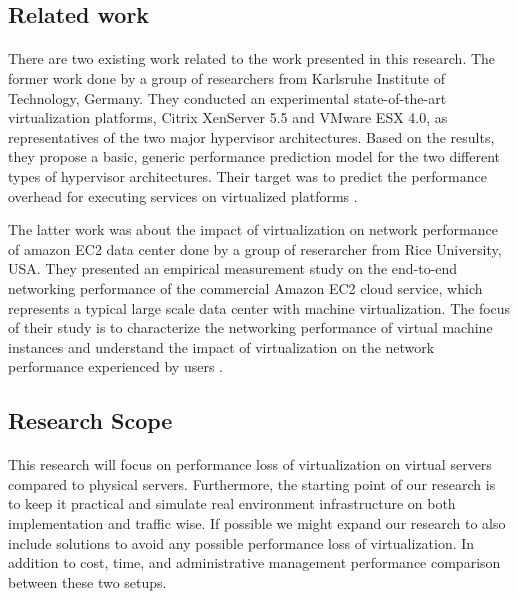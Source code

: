 \subsection{Related work}
\paragraph{}
There are two existing work related to the work presented in this research. The former work done by a group of researchers from Karlsruhe Institute of Technology, Germany. They conducted an experimental  state-of-the-art virtualization platforms, Citrix XenServer 5.5 and VMware ESX 4.0, as representatives of the two major hypervisor architectures. Based on the results, they propose a basic, generic performance prediction model for the two different types of hypervisor architectures. Their target was to predict the performance overhead for executing services on virtualized platforms \cite{rw1}.
\par\indent
The latter work was about the impact of virtualization on network performance of amazon EC2 data center done by a group of reserarcher from Rice University, USA. They presented an empirical measurement study on the end-to-end networking performance of the commercial Amazon EC2 cloud service, which represents a typical large scale data center with machine virtualization. The focus of their study is to characterize the networking performance of virtual machine instances and understand the impact of virtualization on the network performance experienced by users \cite{rw2}.

\subsection{Research Scope}
\paragraph{}
This research will focus on performance loss of virtualization on virtual servers compared to physical servers. Furthermore, the starting point of our research is to keep it practical and simulate real environment infrastructure on both implementation and traffic wise. If possible we might expand our research to also include solutions to avoid any possible performance loss of virtualization. In addition to cost, time, and administrative management performance comparison between these two setups.   


